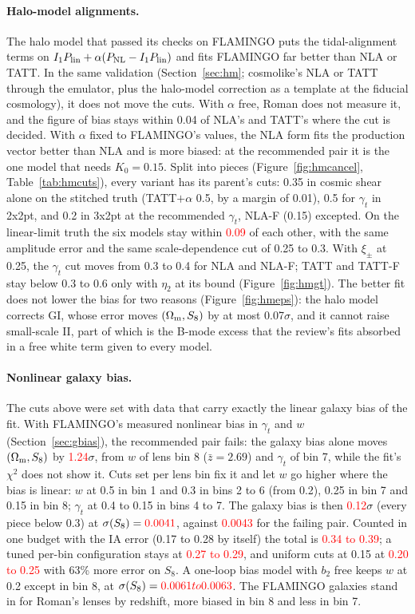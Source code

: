 \documentclass[11pt]{article}
\newcommand{\PNL}{P_{\rm NL}}
\newcommand{\Om}{\Omega_{\rm m}}
\newif\ifnumbersfinal
\newcommand{\refresh}[1]{\ifnumbersfinal#1\else\textcolor{red}{#1}\fi}
\newcommand{\HMlinSpread}{\refresh{0.09}}
\newcommand{\GBbase}{\refresh{1.24}}         %
\newcommand{\GBD}{\refresh{0.12}}            %
\newcommand{\GBDtot}{\refresh{0.34 to 0.39}}
\newcommand{\GBDsig}{\refresh{0.0041}}
\newcommand{\GBbaseSig}{\refresh{0.0043}}
\newcommand{\GBEtot}{\refresh{0.27 to 0.29}}
\newcommand{\GBFtot}{\refresh{0.20 to 0.25}}
\newcommand{\GBolSig}{\refresh{0.0061 to 0.0063}}
\newcommand{\Tol}{0.3}
\begin{document}
\paragraph{Halo-model alignments.}
The halo model that passed its checks on FLAMINGO puts the tidal-alignment
terms on $I_1 P_{\rm lin} + \alpha(\PNL - I_1 P_{\rm lin})$ and fits FLAMINGO
far better than NLA or TATT. In the same validation (Section~\ref{sec:hm};
cosmolike's NLA or TATT through the emulator, plus the halo-model correction
as a template at the fiducial cosmology), it does not move the cuts. With
$\alpha$ free, Roman does not measure it, and the figure of bias stays within
0.04 of NLA's and TATT's where the cut is decided. With $\alpha$ fixed to
FLAMINGO's values, the NLA form fits the production vector better than NLA
and is more biased: at the recommended pair it is the one model that needs
$K_0 = 0.15$. Split into pieces (Figure~\ref{fig:hmcancel},
Table~\ref{tab:hmcuts}), every variant has its parent's cuts: 0.35 in
cosmic shear alone on the stitched truth (TATT$+\alpha$ 0.5, by a margin of
0.01), 0.5 for $\gamma_t$ in 2x2pt, and 0.2 in 3x2pt at the recommended
$\gamma_t$, NLA-F (0.15) excepted. On the linear-limit truth the six models
stay within \HMlinSpread{} of each other, with the same amplitude error and
the same scale-dependence cut of 0.25 to 0.3.
With $\xi_\pm$ at 0.25, the $\gamma_t$ cut moves from 0.3 to 0.4 for NLA
and NLA-F; TATT and TATT-F stay below \Tol{} to 0.6 only with $\eta_2$ at its
bound (Figure~\ref{fig:hmgt}). The better fit
does not lower the bias for two reasons (Figure~\ref{fig:hmeps}): the halo
model corrects GI, whose error moves $(\Om, S_8)$ by at most 0.07$\sigma$,
and it cannot raise small-scale II, part of which is the B-mode excess that
the review's fits absorbed in a free white term given to every model.

\paragraph{Nonlinear galaxy bias.}
The cuts above were set with data that carry exactly the linear galaxy bias
of the fit. With FLAMINGO's measured nonlinear bias in $\gamma_t$ and $w$
(Section~\ref{sec:gbias}), the recommended pair fails: the galaxy bias
alone moves $(\Om, S_8)$ by \GBbase$\sigma$, from $w$ of lens bin 8 ($\bar
z = 2.69$) and $\gamma_t$ of bin 7, while the fit's $\chi^2$ does not show it.
Cuts set per lens bin fix it and let $w$ go higher where the bias is linear:
$w$ at 0.5 in bin 1 and 0.3 in bins 2 to 6 (from 0.2), 0.25 in bin 7 and
0.15 in bin 8; $\gamma_t$ at 0.4 to 0.15 in bins 4 to 7. The galaxy bias is
then \GBD$\sigma$ (every piece below \Tol) at $\sigma(S_8) = \GBDsig$,
against \GBbaseSig{} for the failing pair. Counted in one budget with the IA
error (0.17 to 0.28 by itself) the total is \GBDtot; a tuned per-bin
configuration stays at \GBEtot, and uniform cuts at 0.15 at \GBFtot{} with
63\% more error on $S_8$. A one-loop bias model with $b_2$ free keeps $w$ at
0.2 except in bin 8, at $\sigma(S_8) = \GBolSig$. The FLAMINGO galaxies
stand in for Roman's lenses by redshift, more biased in bin 8 and less in
bin 7.
\end{document}
